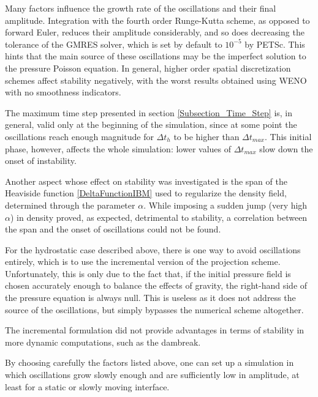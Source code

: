 \documentclass[11pt, a4paper, oneside, openany]{book}
\begin{document}
Many factors influence the growth rate of the oscillations and their final amplitude. Integration with the fourth order Runge-Kutta scheme, as opposed to forward Euler, reduces their amplitude considerably, and so does decreasing the tolerance of the GMRES solver, which is set by default to $10^{-5}$ by PETSc. This hints that the main source of these oscillations may be the imperfect solution to the pressure Poisson equation. In general, higher order spatial discretization schemes affect stability negatively, with the worst results obtained using WENO with no smoothness indicators.\par
The maximum time step presented in section \ref{Subsection_Time_Step} is, in general, valid only at the beginning of the simulation, since at some point the oscillations reach enough magnitude for $\Delta t_{h}$ to be higher than $\Delta t_{max}$. This initial phase, however, affects the whole simulation: lower values of $\Delta t_{max}$ slow down the onset of instability.\par
Another aspect whose effect on stability was investigated is the span of the Heaviside function \eqref{DeltaFunctionIBM} used to regularize the density field, determined through the parameter $\alpha$. While imposing a sudden jump (very high $\alpha$) in density proved, as expected, detrimental to stability, a correlation between the span and the onset of oscillations could not be found.\par
For the hydrostatic case described above, there is one way to avoid oscillations entirely, which is to use the incremental version of the projection scheme. Unfortunately, this is only due to the fact that, if the initial pressure field is chosen accurately enough to balance the effects of gravity, the right-hand side of the pressure equation is always null. This is useless as it does not address the source of the oscillations, but simply bypasses the numerical scheme altogether.\par
The incremental formulation did not provide advantages in terms of stability in more dynamic computations, such as the dambreak.\par
By choosing carefully the factors listed above, one can set up a simulation in which oscillations grow slowly enough and are sufficiently low in amplitude, at least for a static or slowly moving interface.
\end{document}
